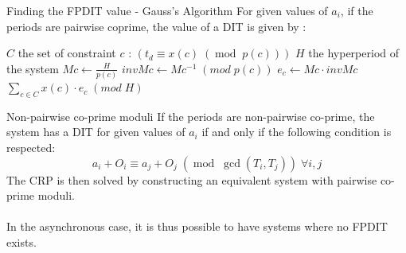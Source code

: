 \documentclass{beamer}
\begin{document}
    \begin{frame}{Finding the FPDIT value - Gauss's Algorithm}
        For given values of $a_i$, if the periods are pairwise coprime, the value of a DIT is given by :

        \begin{algorithm}[H]
            \caption{Gauss's CRP Algorithm}
            \label{alg:algoCRP}
            \begin{algorithmic}[1]
                \REQUIRE $C$ the set of constraint $c$ : $\left( t_d \equiv x(c) \; (\operatorname{mod} \; p(c)) \right)$
                \REQUIRE $H$ the hyperperiod of the system
                    \STATE $Mc \leftarrow \frac{H}{p(c)}$
                    \STATE $invMc \leftarrow Mc^{-1} \; (mod \; p(c))$
                    \STATE $e_c \leftarrow Mc \cdot invMc$
                \ENDFOR
                \RETURN $\sum\limits_{c \in C}{x(c) \cdot e_c} \; (mod \; H)$
            \end{algorithmic}
        \end{algorithm}

    \end{frame}

    \begin{frame}{Non-pairwise co-prime moduli}
        If the periods are non-pairwise co-prime, the system has a DIT for given values of $a_i$ if and only if the following condition is respected:
        \[
            a_i + O_i \equiv a_j + O_j \; (\operatorname{mod} \; \operatorname{gcd}(T_i,
            T_j)) \; \forall i,j
        \]
		The CRP is then solved by constructing an equivalent system with pairwise co-prime moduli.\\

		~\\

		In the asynchronous case, it is thus possible to have systems where no FPDIT exists.



    \end{frame}
\end{document}
